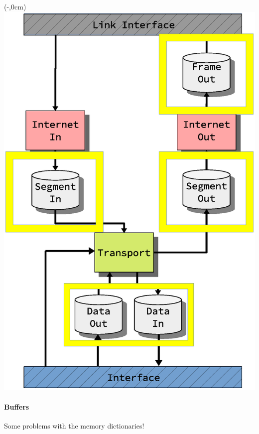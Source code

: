 
\begin{frame}[fragile]
    \begin{textblock*}{\displayThumbnail}(\paperwidth-\displayThumbnail-0.2cm,0cm) %
        \colorbox{white}{\includegraphics[width=\textwidth]{implementation/design_2_memory.eps}}
    \end{textblock*}
    \frametitle{\ImplementationTitle}
    \framesubtitle{Buffers}
    Some problems with the memory dictionaries!
    \begin{figure}
        \centering
        \begin{overlayarea}{0.76\textwidth}{\textheight}

\end{overlayarea}
\end{figure}
\end{frame}
